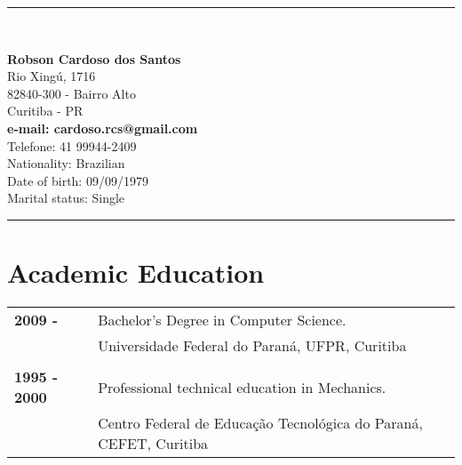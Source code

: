\documentclass[pdftex, a4paper, 11pt]{article}
\begin{document}
\vspace*{.3cm}
\begin{center}
  \rule{.8\textwidth}{1pt}\\[10pt]
  \begin{minipage}{.55\textwidth}
    \LARGE\textbf{Robson Cardoso dos Santos}\\[13pt]
    \small Rio Xingú, 1716\\
    82840-300 - Bairro Alto\\
    Curitiba - PR\\[6pt]
    \textbf{e-mail: cardoso.rcs@gmail.com}\\
    Telefone: 41 99944-2409\\[6pt]
    \small Nationality: Brazilian\\
    \small Date of birth: 09/09/1979\\
    \small Marital status: Single\\
  \end{minipage}
  \rule{.8\textwidth}{1pt}
\end{center}
\vspace*{1cm}



\section*{Academic Education}
\begin{tabular}{ll}
  \textbf{2009 - } & Bachelor's Degree in Computer Science.\\
  & Universidade Federal do Paraná, UFPR, Curitiba\\
  & \\
  \textbf{1995 - 2000} & Professional technical education in Mechanics.\\
  & Centro Federal de Educação Tecnológica do Paraná, CEFET, Curitiba\\
\end{tabular}
\end{document}
